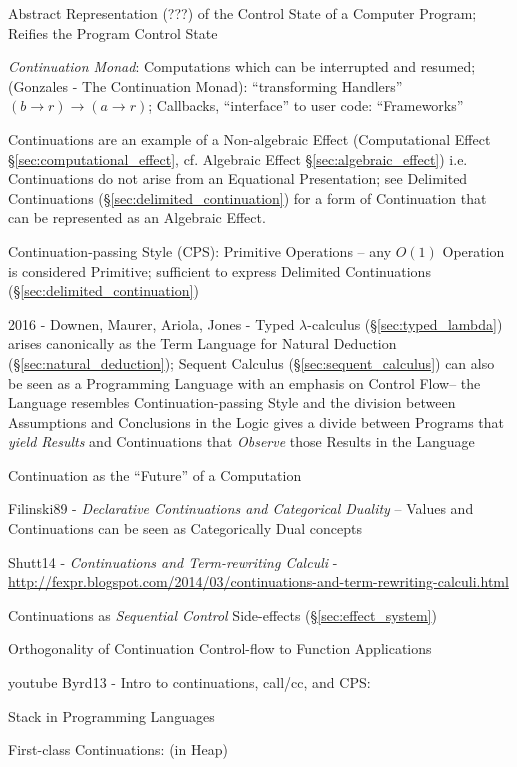 Abstract Representation (???) of the Control State of a Computer Program;
Reifies the Program Control State

\emph{Continuation Monad}: Computations which can be interrupted and resumed;
(Gonzales - The Continuation Monad): ``transforming Handlers''
$(b \rightarrow r) \rightarrow (a \rightarrow r)$; Callbacks, ``interface'' to
user code: ``Frameworks''

Continuations are an example of a Non-algebraic Effect (Computational Effect
\S\ref{sec:computational_effect}, cf. Algebraic Effect
\S\ref{sec:algebraic_effect}) i.e. Continuations do not arise from an Equational
Presentation; see Delimited Continuations (\S\ref{sec:delimited_continuation})
for a form of Continuation that can be represented as an Algebraic Effect.

Continuation-passing Style (CPS): Primitive Operations -- any $O(1)$ Operation
is considered Primitive; sufficient to express Delimited Continuations
(\S\ref{sec:delimited_continuation})

2016 - Downen, Maurer, Ariola, Jones - Typed $\lambda$-calculus
(\S\ref{sec:typed_lambda}) arises canonically as the Term Language for Natural
Deduction (\S\ref{sec:natural_deduction}); Sequent Calculus
(\S\ref{sec:sequent_calculus}) can also be seen as a Programming Language with
an emphasis on Control Flow-- the Language resembles Continuation-passing Style
and the division between Assumptions and Conclusions in the Logic gives a divide
between Programs that \emph{yield Results} and Continuations that \emph{Observe}
those Results in the Language


Continuation as the ``Future'' of a Computation

Filinski89 - \emph{Declarative Continuations and Categorical Duality} -- Values
and Continuations can be seen as Categorically Dual concepts

Shutt14 - \emph{Continuations and Term-rewriting Calculi} -
\url{http://fexpr.blogspot.com/2014/03/continuations-and-term-rewriting-calculi.html}

Continuations as \emph{Sequential Control} Side-effects
(\S\ref{sec:effect_system})

Orthogonality of Continuation Control-flow to Function Applications


\asterism


youtube Byrd13 - Intro to continuations, call/cc, and CPS:

Stack in Programming Languages

First-class Continuations: (in Heap) %

